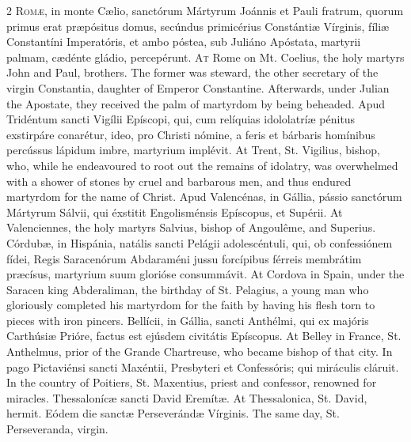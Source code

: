 \begin{paracol}{2}
\lettrine[lines=2]{R}{omæ,} in monte Cælio, 
 sanctórum Mártyrum Joánnis et Pauli fratrum, quorum primus erat præpósitus 
 domus, secúndus primicérius Constántiæ Vírginis, fíliæ Constantíni 
 Imperatóris, et ambo póstea, sub Juliáno Apóstata, martyrii palmam, cædénte 
 gládio, percepérunt.
\switchcolumn
{}
\lettrine[lines=2]{A}{t} Rome on Mt. Coelius, the holy 
 martyrs John and Paul, brothers. The former was steward, the other 
 secretary of the virgin Constantia, daughter of Emperor Constantine. 
 Afterwards, under Julian the Apostate, they received the palm of martyrdom 
 by being beheaded.
\switchcolumn*
{}
Apud Tridéntum sancti 
 Vigílii Epíscopi, qui, cum relíquias idololatríæ pénitus exstirpáre 
 conarétur, ideo, pro Christi nómine, a feris et bárbaris homínibus percússus 
 lápidum imbre, martyrium implévit.
\switchcolumn
{}
At Trent, St. Vigilius, bishop, who, 
 while he endeavoured to root out the remains of idolatry, was overwhelmed 
 with a shower of stones by cruel and barbarous men, and thus endured 
 martyrdom for the name of Christ.
\switchcolumn*
{}
Apud Valencénas, in 
 Gállia, pássio sanctórum Mártyrum Sálvii, qui éxstitit Engolisménsis 
 Epíscopus, et Supérii.
\switchcolumn
{}
At Valenciennes, the holy martyrs Salvius, bishop of Angoulême, and Superius.
\switchcolumn*
{}
Córdubæ, in Hispánia, 
 natális sancti Pelágii adolescéntuli, qui, ob confessiónem fídei, Regis 
 Saracenórum Abdaraméni jussu forcípibus férreis membrátim præcísus, 
 martyrium suum glorióse consummávit.
\switchcolumn
{}
At Cordova in Spain, under the 
 Saracen king Abderaliman, the birthday of St. Pelagius, a young man who 
 gloriously completed his martyrdom for the faith by having his flesh torn to 
 pieces with iron pincers.
\switchcolumn*
{}
Bellícii, in Gállia, 
 sancti Anthélmi, qui ex majóris Carthúsiæ Prióre, factus est ejúsdem 
 civitátis Epíscopus.
\switchcolumn
{}
At Belley in France, St. Anthelmus, 
 prior of the Grande Chartreuse, who became bishop of that city.
\switchcolumn*
{}
In pago Pictaviénsi 
 sancti Maxéntii, Presbyteri et Confessóris; qui miráculis cláruit.
\switchcolumn
{}
In the country of Poitiers, St. 
 Maxentius, priest and confessor, renowned for miracles.
\switchcolumn*
{}
Thessalonícæ sancti 
 David Eremítæ.
\switchcolumn
{}
At Thessalonica, St. David, hermit.
\switchcolumn*
{}
Eódem die sanctæ 
 Perseverándæ Vírginis.
\switchcolumn
{}
The same day, St. Perseveranda, 
 virgin.
\switchcolumn*
{}
\end{paracol}


